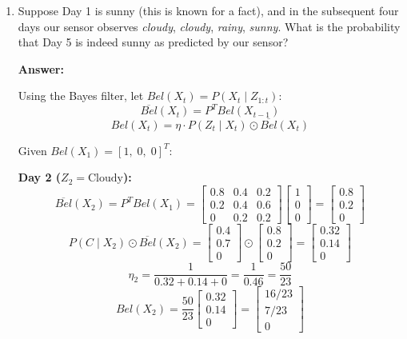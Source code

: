\documentclass{article}
\begin{document}
\begin{enumerate}
    \item[(a)] Suppose Day 1 is sunny (this is known for a fact), and in the subsequent four days our sensor observes \textit{cloudy}, \textit{cloudy}, \textit{rainy}, \textit{sunny}. What is the probability that Day 5 is indeed sunny as predicted by our sensor?

    \textbf{Answer:}

    Using the Bayes filter, let $Bel(X_t) = P(X_t \mid Z_{1:t})$:
    $$ \overline{Bel}(X_t) = P^T Bel(X_{t-1}) $$
    $$ Bel(X_t) = \eta \cdot P(Z_t \mid X_t) \odot \overline{Bel}(X_t) $$

    Given $Bel(X_1) = [1,\; 0,\; 0]^T$:

    \textbf{Day 2 ($Z_2 = \text{Cloudy}$):}
    $$ \overline{Bel}(X_2) = P^T Bel(X_1) = \begin{bmatrix} 0.8 & 0.4 & 0.2 \\ 0.2 & 0.4 & 0.6 \\ 0 & 0.2 & 0.2 \end{bmatrix} \begin{bmatrix} 1 \\ 0 \\ 0 \end{bmatrix} = \begin{bmatrix} 0.8 \\ 0.2 \\ 0 \end{bmatrix} $$
    $$ P(C \mid X_2) \odot \overline{Bel}(X_2) = \begin{bmatrix} 0.4 \\ 0.7 \\ 0 \end{bmatrix} \odot \begin{bmatrix} 0.8 \\ 0.2 \\ 0 \end{bmatrix} = \begin{bmatrix} 0.32 \\ 0.14 \\ 0 \end{bmatrix} $$
    $$ \eta_2 = \frac{1}{0.32 + 0.14 + 0} = \frac{1}{0.46} = \frac{50}{23} $$
    $$ Bel(X_2) = \frac{50}{23} \begin{bmatrix} 0.32 \\ 0.14 \\ 0 \end{bmatrix} = \begin{bmatrix} 16/23 \\ 7/23 \\ 0 \end{bmatrix} $$


\end{enumerate}
\end{document}

